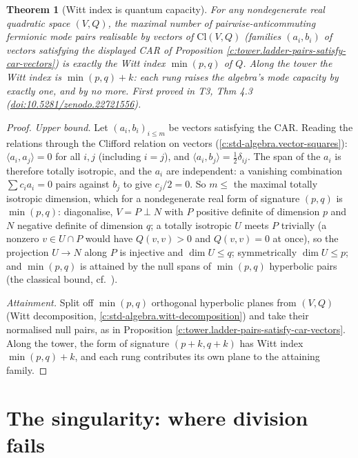 \documentclass[11pt]{article}
\newtheorem{theorem}{Theorem}[section]
\theoremstyle{definition}
\theoremstyle{plain}
\providecommand{\Cl}{}\renewcommand{\Cl}{\mathrm{Cl}}
\begin{document}
\begin{theorem}[Witt index is quantum capacity]\label{c:tower.witt-index-quantum-capacity}
For any nondegenerate real quadratic space $(V, Q)$, the maximal number of pairwise-anticommuting fermionic mode pairs realisable by \emph{vectors} of $\Cl(V, Q)$ (families $(a_i, b_i)$ of vectors satisfying the displayed CAR of Proposition \ref{c:tower.ladder-pairs-satisfy-car-vectors}) is exactly the Witt index $\min(p,q)$ of $Q$. Along the tower the Witt index is $\min(p,q) + k$: each rung raises the algebra's mode capacity by exactly one, and by no more.
\emph{First proved in} T3, Thm 4.3 (\href{https://doi.org/10.5281/zenodo.22721556}{doi:10.5281/zenodo.22721556}).
\end{theorem}
\begin{proof}
\emph{Upper bound.} Let $(a_i, b_i)_{i \leq m}$ be vectors satisfying the CAR. Reading the relations through the Clifford relation on vectors (\ref{c:std-algebra.vector-squares}): $\langle a_i, a_j \rangle = 0$ for all $i, j$ (including $i = j$), and $\langle a_i, b_j \rangle = \tfrac12 \delta_{ij}$. The span of the $a_i$ is therefore totally isotropic, and the $a_i$ are independent: a vanishing combination $\sum c_i a_i = 0$ pairs against $b_j$ to give $c_j/2 = 0$. So $m \leq$ the maximal totally isotropic dimension, which for a nondegenerate real form of signature $(p,q)$ is $\min(p,q)$: diagonalise, $V = P \perp N$ with $P$ positive definite of dimension $p$ and $N$ negative definite of dimension $q$; a totally isotropic $U$ meets $P$ trivially (a nonzero $v \in U \cap P$ would have $Q(v,v) > 0$ and $Q(v,v) = 0$ at once), so the projection $U \to N$ along $P$ is injective and $\dim U \leq q$; symmetrically $\dim U \leq p$; and $\min(p,q)$ is attained by the null spans of $\min(p,q)$ hyperbolic pairs (the classical bound, cf.\ \cite[Ch.~I]{Lam2005}).

\emph{Attainment.} Split off $\min(p,q)$ orthogonal hyperbolic planes from $(V, Q)$ (Witt decomposition, \ref{c:std-algebra.witt-decomposition}) and take their normalised null pairs, as in Proposition \ref{c:tower.ladder-pairs-satisfy-car-vectors}. Along the tower, the form of signature $(p{+}k, q{+}k)$ has Witt index $\min(p,q) + k$, and each rung contributes its own plane to the attaining family.

\end{proof}

\section{The singularity: where division fails}
\end{document}
